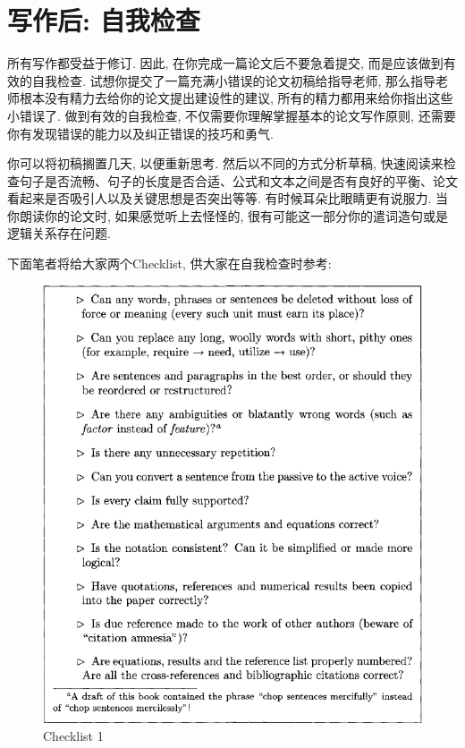 \documentclass{formatBook}
\begin{document}
\section{写作后: 自我检查}
所有写作都受益于修订. 因此, 在你完成一篇论文后不要急着提交, 而是应该做到有效的自我检查. 试想你提交了一篇充满小错误的论文初稿给指导老师, 那么指导老师根本没有精力去给你的论文提出建设性的建议, 所有的精力都用来给你指出这些小错误了. 做到有效的自我检查, 不仅需要你理解掌握基本的论文写作原则, 还需要你有发现错误的能力以及纠正错误的技巧和勇气. \par
你可以将初稿搁置几天, 以便重新思考. 然后以不同的方式分析草稿, 快速阅读来检查句子是否流畅、句子的长度是否合适、公式和文本之间是否有良好的平衡、论文看起来是否吸引人以及关键思想是否突出等等. 有时候耳朵比眼睛更有说服力. 当你朗读你的论文时, 如果感觉听上去怪怪的, 很有可能这一部分你的遣词造句或是逻辑关系存在问题. \par
下面笔者将给大家两个Checklist\cite{TanChecklist}, 供大家在自我检查时参考: 
\begin{figure}[htb]
    \centering
    \includegraphics{figure/Figure 7.1.png}
    \caption{Checklist 1}
    \label{fig:my_label}
\end{figure}
\end{document}
